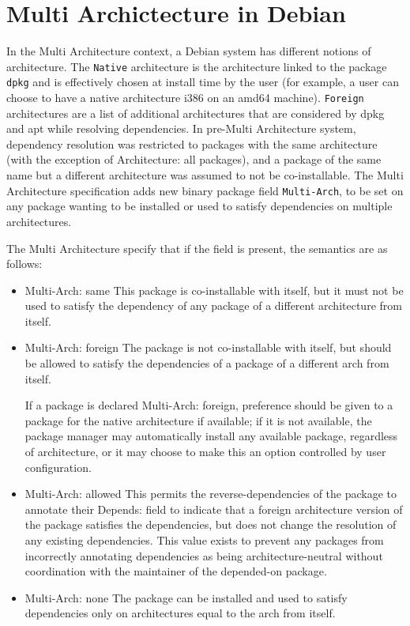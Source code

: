 \section{Multi Archictecture in Debian}

In the Multi Architecture context, a Debian system has different notions of
architecture. The \texttt{Native} architecture is the architecture linked to
the package \texttt{dpkg} and is effectively chosen at install time by the user
(for example, a user can choose to have a native architecture i386 on an amd64
machine). \texttt{Foreign} architectures are a list of additional
architectures that are considered by dpkg and apt while resolving dependencies. 
In pre-Multi Architecture system, dependency resolution was restricted to
packages with the same architecture (with the exception of Architecture: all
packages), and a package of the same name but a different architecture was
assumed to not be co-installable. The Multi Architecture specification adds new
binary package field \texttt{Multi-Arch}, to be set on any package wanting to
be installed or used to satisfy dependencies on multiple architectures.

The Multi Architecture specify that if the field is present, the semantics are as follows:

\begin{itemize}
  \item{Multi-Arch: same} This package is co-installable with itself,
    but it must not be used to satisfy the dependency of any package
    of a different architecture from itself. 

  \item{Multi-Arch: foreign} The package is not co-installable with
    itself, but should be allowed to satisfy the dependencies of a
    package of a different arch from itself.

    If a package is declared Multi-Arch: foreign, preference should be
    given to a package for the native architecture if available; if it
    is not available, the package manager may automatically install
    any available package, regardless of architecture, or it may
    choose to make this an option controlled by user configuration. 

  \item{Multi-Arch: allowed} This permits the reverse-dependencies of
    the package to annotate their Depends: field to indicate that a
    foreign architecture version of the package satisfies the
    dependencies, but does not change the resolution of any existing
    dependencies. This value exists to prevent any packages from
    incorrectly annotating dependencies as being architecture-neutral
    without coordination with the maintainer of the depended-on
    package. 

  \item{Multi-Arch: none}
    The package can be installed and used to satisfy dependencies only
    on architectures equal to the arch from itself.
\end{itemize}

